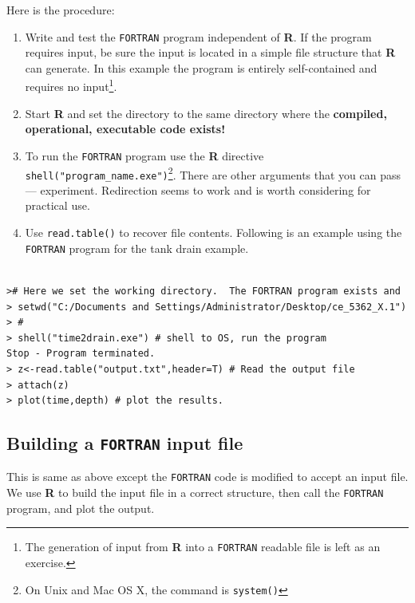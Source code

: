 \documentclass[12pt]{article}
\begin{document}
Here is the procedure:
\begin{enumerate}
\item Write and test the \texttt{FORTRAN} program independent of \textbf{R}.  If the program requires input, be sure the input is located in a simple file structure that \textbf{R} can generate.  In this example the program is entirely self-contained and requires no input\footnote{The generation of input from \textbf{R} into a \texttt{FORTRAN} readable file is left as an exercise.}.
\item Start \textbf{R} and set the directory to the same directory where the \textbf{compiled, operational, executable code exists!}
\item To run the \texttt{FORTRAN} program use the \textbf{R} directive \texttt{shell("program\_name.exe")}\footnote{On Unix and Mac OS X, the command is \texttt{system()}}.  There are other arguments that you can pass --- experiment.  Redirection seems to work and is worth considering for practical use.
\item Use \texttt{read.table()} to recover file contents.  Following is an example using the \texttt{FORTRAN} program for the tank drain example.
\end{enumerate}

\begin{verbatim}

># Here we set the working directory.  The FORTRAN program exists and 
> setwd("C:/Documents and Settings/Administrator/Desktop/ce_5362_X.1")
> #
> shell("time2drain.exe") # shell to OS, run the program
Stop - Program terminated.
> z<-read.table("output.txt",header=T) # Read the output file
> attach(z)
> plot(time,depth) # plot the results.
\end{verbatim}

\subsection{Building a \texttt{FORTRAN} input file}
This is same as above except the \texttt{FORTRAN} code is modified to accept an input file.  We use \textbf{R} to build the input file in a correct structure, then call the \texttt{FORTRAN} program, and plot the output.
\end{document}
